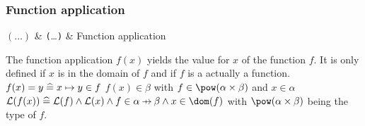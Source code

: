 \subsubsection{Function application}
\label{function_application}
\begin{rrnames}
  $(\ldots)$  & \texttt{(}\ldots\texttt{)}  & Function application
\end{rrnames}
\begin{rodinrefentry}
  \rrdesc
    The function application $f(x)$ yields the value for $x$ of the function $f$.
    It is only defined if $x$ is in the domain of $f$ and if $f$ is a actually a function.
  \rrdef
    $f(x) = y \mathrel{\widehat=} x \mapsto y\in f$
  \rrtypes
    $f(x)\in\beta$ with $f\in\pow(\alpha\cprod\beta)$ and $x\in\alpha$
  \rrwd
    $\wdl(f(x))\defi\wdl(f)\land\wdl(x)\land f\in\alpha\pfun\beta \land x\in\dom(f)$
    with $\pow(\alpha\cprod\beta)$ being the type of $f$.
\end{rodinrefentry}

